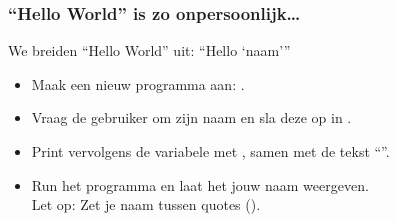 \begin{frame}
\frametitle{``Hello World'' is zo onpersoonlijk\ldots}

We breiden ``Hello World'' uit: ``Hello {`naam'}''
\begin{itemize}
  \item<2-> Maak een nieuw programma aan: .
  \item<3-> Vraag de gebruiker om zijn naam en sla deze op in .
  \item<4-> Print vervolgens de  variabele met , samen met de tekst ``''.
  \item<5-> Run het programma en laat het jouw naam weergeven. \\ Let op: Zet je naam tussen quotes (\tifonttxt{\qt}).
\end{itemize}


\end{frame}




